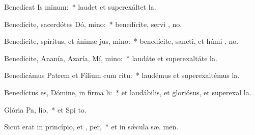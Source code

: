 \item Benedícat Is minum:~* laudet et superexáltet   la.
\item Benedícite, sacerdótes Dó, mino:~* benedícite, servi , no.
\item Benedícite, spíritus, et ánimæ jus, mino:~* benedícite, sancti, et húmi , no.
\item Benedícite, Ananía, Azaría, Mí, mino:~* laudáte et superexaltáte   la.
\item Benedicámus Patrem et Fílium cum  ritu:~* laudémus et superexaltémus   la.
\item Benedíctus es, Dómine, in firma li:~* et laudábilis, et gloriósus, et superexal  la.
\item Glória Pa,  lio,~* et Spi to.
\item Sicut erat in princípio, et ,  per,~* et in sǽcula sæ. men.
